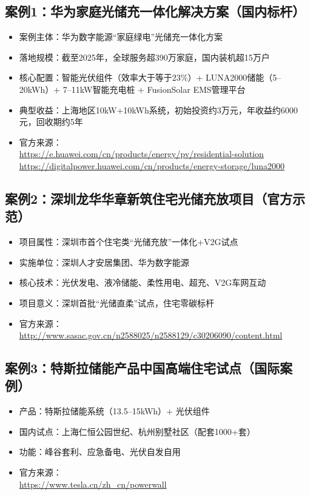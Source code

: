 \documentclass[12pt,a4paper,UTF8]{ctexart}
\begin{document}
\subsection*{案例1：华为家庭光储充一体化解决方案（国内标杆）}
\begin{itemize}
    \item 案例主体：华为数字能源“家庭绿电”光储充一体化方案
    \item 落地规模：截至2025年，全球服务超390万家庭，国内装机超15万户
    \item 核心配置：智能光伏组件（效率大于等于23\%）+ LUNA2000储能（5--20kWh）+ 7--11kW智能充电桩 + FusionSolar EMS管理平台
    \item 典型收益：上海地区10kW+10kWh系统，初始投资约3万元，年收益约6000元，回收期约5年
    \item 官方来源：\\
    \url{https://e.huawei.com/cn/products/energy/pv/residential-solution}\\
    \url{https://digitalpower.huawei.com/cn/products/energy-storage/luna2000}
\end{itemize}

\subsection*{案例2：深圳龙华华章新筑住宅光储充放项目（官方示范）}
\begin{itemize}
    \item 项目属性：深圳市首个住宅类“光储充放”一体化+V2G试点
    \item 实施单位：深圳人才安居集团、华为数字能源
    \item 核心技术：光伏发电、液冷储能、柔性用电、超充、V2G车网互动
    \item 项目意义：深圳首批“光储直柔”试点，住宅零碳标杆
    \item 官方来源：\\
    \url{http://www.sasac.gov.cn/n2588025/n2588129/c30206090/content.html}
\end{itemize}

\subsection*{案例3：特斯拉储能产品中国高端住宅试点（国际案例）}
\begin{itemize}
    \item 产品：特斯拉储能系统（13.5--15kWh）+ 光伏组件
    \item 国内试点：上海仁恒公园世纪、杭州别墅社区（配套1000+套）
    \item 功能：峰谷套利、应急备电、光伏自发自用
    \item 官方来源：\\
    \url{https://www.tesla.cn/zh_cn/powerwall}
\end{itemize}
\end{document}
